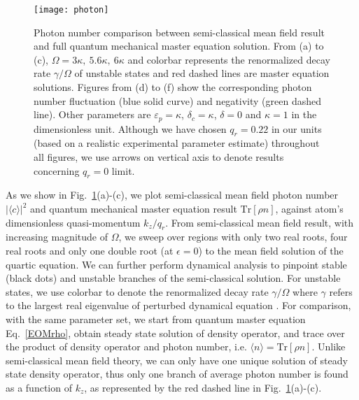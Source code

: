 \documentclass[atoms,article,submit,moreauthors,pdftex,12pt,a4paper]{mdpi}
\begin{document}
\begin{figure}[htp]
\texttt{[image: photon]}
\caption{ Photon number comparison between semi-classical mean field result and full quantum mechanical master equation solution. From (a) to (c), $\Omega = 3\kappa,\ 5.6\kappa,\ 6\kappa$ and colorbar represents the renormalized decay rate $\gamma/\Omega$ of unstable states and red dashed lines are master equation solutions. Figures from (d) to (f) show the corresponding photon number fluctuation (blue solid curve) and negativity (green dashed line). Other parameters are $\varepsilon_p=\kappa$, $\delta_c=\kappa$, $\delta=0$ and $\kappa=1$ in the dimensionless unit. Although we have chosen $q_r=0.22$ in our units (based on a realistic experimental parameter estimate) throughout all figures, we use arrows on vertical axis to denote results concerning $q_r=0$ limit. 
}
\label{photon}
\end{figure}

As we show in Fig.~\ref{photon}(a)-(c), we plot semi-classical mean field  photon number $|\langle c\rangle|^2$ and quantum mechanical master equation result $\text{Tr}[\rho n]$, against atom's dimensionless quasi-momentum $k_z/q_r$. From semi-classical mean field result, with increasing magnitude of $\Omega$, we sweep over regions with only two real roots, four real roots and only one double root (at $\epsilon=0$) to the mean field solution of the quartic equation. We can further perform dynamical analysis \cite{cavitySOC} to pinpoint stable (black dots) and unstable branches of the semi-classical solution. For unstable states, we use colorbar to denote the renormalized decay rate $\gamma/\Omega$ where $\gamma$ refers to the largest real eigenvalue of perturbed dynamical equation \cite{cavitySOC}. 
For comparison, with the same parameter set, we start from quantum master equation Eq.~\ref{EOMrho}, obtain steady state solution of density operator, and trace over the product of density operator and photon number, i.e. $\langle n\rangle=\text{Tr}[\rho n]$. Unlike semi-classical mean field theory, we can only have one unique solution of steady state density operator, thus only one branch of average photon number is found as a function of $k_z$, as represented by the red dashed line in  Fig.~\ref{photon}(a)-(c).
\end{document}
